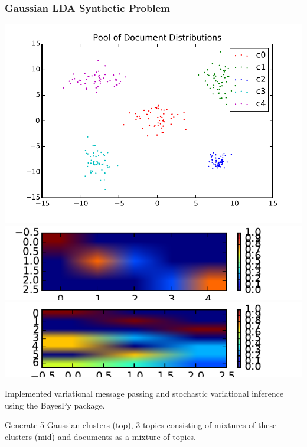 \documentclass{beamer}
\begin{document}
\begin{frame}
  \frametitle{Gaussian LDA Synthetic Problem}
  \begin{center}
    \includegraphics[height=0.2\textheight]{assets/plot.pdf}\\
    \includegraphics[height=0.2\textheight]{assets/true_topics.pdf}\\
    \includegraphics[height=0.2\textheight]{assets/true_document_dictionary.pdf}
  \end{center}
  \begin{itemize}
    {\tiny
    \item Implemented variational message passing \citep{Winn05} and stochastic variational inference using the BayesPy \citep{Luttinen14} package. 
    \item Generate 5 Gaussian clusters (top), 3 topics consisting of mixtures of these clusters (mid) and documents as a mixture of topics.
    }
  \end{itemize}
\end{frame}
\end{document}
